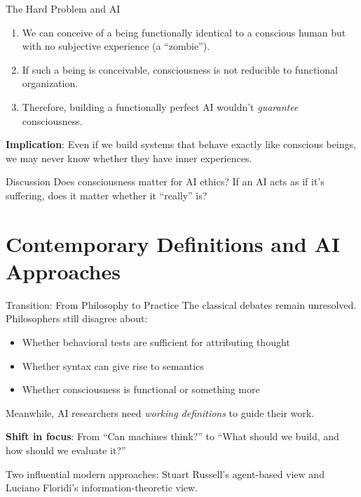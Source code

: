 \documentclass[aspectratio=169,11pt]{beamer}
\begin{document}
\begin{frame}{The Hard Problem and AI}
\begin{objectionbox}
\small
\begin{enumerate}
    \item We can conceive of a being functionally identical to a conscious human but with no subjective experience (a ``zombie'').
    \item If such a being is conceivable, consciousness is not reducible to functional organization.
    \item Therefore, building a functionally perfect AI wouldn't \emph{guarantee} consciousness.
\end{enumerate}
\end{objectionbox}

\vspace{0.1em}
\textbf{Implication}: Even if we build systems that behave exactly like conscious beings, we may never know whether they have inner experiences.

\vspace{0.1em}
\begin{alertblock}{Discussion}
Does consciousness matter for AI ethics? If an AI acts as if it's suffering, does it matter whether it ``really'' is?
\end{alertblock}
\end{frame}

\section{Contemporary Definitions and AI Approaches}

\begin{frame}{Transition: From Philosophy to Practice}
The classical debates remain unresolved. Philosophers still disagree about:
\begin{itemize}
    \item Whether behavioral tests are sufficient for attributing thought
    \item Whether syntax can give rise to semantics
    \item Whether consciousness is functional or something more
\end{itemize}

\vspace{0.3em}
Meanwhile, AI researchers need \emph{working definitions} to guide their work.

\vspace{0.3em}
\textbf{Shift in focus}: From ``Can machines think?'' to ``What should we build, and how should we evaluate it?''

\vspace{0.3em}
Two influential modern approaches: Stuart Russell's agent-based view and Luciano Floridi's information-theoretic view.
\end{frame}
\end{document}
